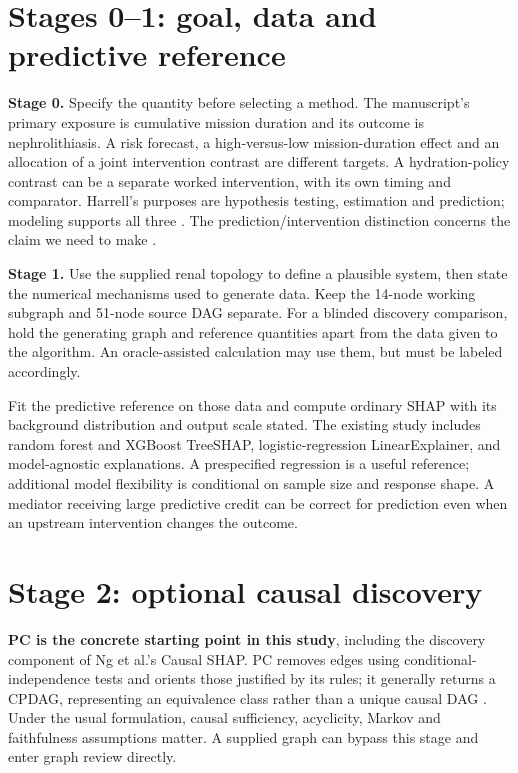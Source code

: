 \documentclass[11pt,letterpaper]{article}
\begin{document}
\clearpage
\section*{Stages 0--1: goal, data and predictive reference}

\textbf{Stage 0.} Specify the quantity before selecting a method. The manuscript's primary exposure is cumulative mission duration and its outcome is nephrolithiasis. A risk forecast, a high-versus-low mission-duration effect and an allocation of a joint intervention contrast are different targets. A hydration-policy contrast can be a separate worked intervention, with its own timing and comparator. Harrell's purposes are hypothesis testing, estimation and prediction; modeling supports all three \citep{HarrellRMSIntroduction}. The prediction/intervention distinction concerns the claim we need to make \citep{HernanHsuHealy2019}.

\textbf{Stage 1.} Use the supplied renal topology to define a plausible system, then state the numerical mechanisms used to generate data. Keep the 14-node working subgraph and 51-node source DAG separate. For a blinded discovery comparison, hold the generating graph and reference quantities apart from the data given to the algorithm. An oracle-assisted calculation may use them, but must be labeled accordingly.

Fit the predictive reference on those data and compute ordinary SHAP with its background distribution and output scale stated. The existing study includes random forest and XGBoost TreeSHAP, logistic-regression LinearExplainer, and model-agnostic explanations. A prespecified regression is a useful reference; additional model flexibility is conditional on sample size and response shape. A mediator receiving large predictive credit can be correct for prediction even when an upstream intervention changes the outcome.

\section*{Stage 2: optional causal discovery}

\textbf{PC is the concrete starting point in this study}, including the discovery component of Ng et al.'s Causal SHAP. PC removes edges using conditional-independence tests and orients those justified by its rules; it generally returns a CPDAG, representing an equivalence class rather than a unique causal DAG \citep{Kalisch2012,Ng2025}. Under the usual formulation, causal sufficiency, acyclicity, Markov and faithfulness assumptions matter. A supplied graph can bypass this stage and enter graph review directly.
\end{document}
